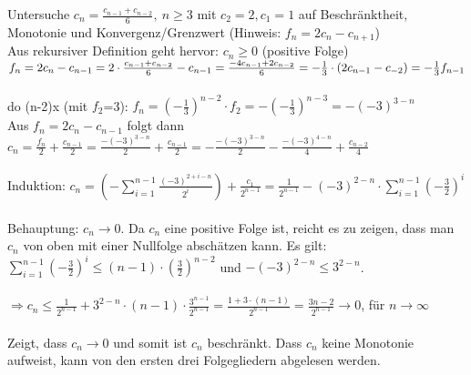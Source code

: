 \begin{example}
	Untersuche $c_n = \frac{c_{n-1} + c_{n-2}}{6},~n \geq 3$ mit $c_2 = 2, c_1 = 1$ auf Beschränktheit, Monotonie
	und Konvergenz/Grenzwert (Hinweis: $f_n = 2 c_n - c_{n+1}$)\\
	
	Aus rekursiver Definition geht hervor: $c_n \geq 0$ (positive Folge)\\
    $f_n = 2 c_n -c_{n-1} = 2 \cdot \frac{c_{n-1} + c_{n-2}}{6} - c_{n-1} = \frac{-4 c_{n-1} +
		2c_{n-2}}{6} =-\frac{1}{3} \cdot (2c_{n-1} - c_{-2})\\
        = -\frac{1}{3} f_{n-1}$\\ \\
	do (n-2)x (mit $f_2$=3):
    $f_n = (-\frac{1}{3})^{n-2} \cdot f_2 = -( - \frac{1}{3})^{n-3} = -(-3)^{3-n}$\\ 
	Aus $f_n = 2c_n - c_{n-1}$ folgt dann\\
    $c_n = \frac{f_n}{2} + \frac{c_{n-1}}{2} = \frac{-(-3)^{3-n}}{2} + \frac{c_{n-1}}{2}
							= - \frac{-(-3)^{3-n}}{2} - \frac{-(-3)^{4-n}}{4} + \frac{c_{n-2}}{4}$\\ \\
	Induktion:
    $c_n = ( - \sum^{n-1}_{i=1} \frac{(-3)^{2+i-n}}{2^i}) + \frac{c_1}{2^{n-1}} =
		\frac{1}{2^{n-1}} - (-3)^{2-n} \cdot \sum^{n-1}_{i=1}(-\frac{3}{2})^i$\\ \\
	Behauptung: $c_n \to 0$. Da $c_n$ eine positive Folge ist, reicht es zu zeigen, dass man $c_n$ von oben mit
	einer Nullfolge abschätzen kann. Es gilt: $\sum^{n-1}_{i=1} ( - \frac{3}{2})^i \leq (n-1) \cdot
	( \frac{3}{2})^{n-2}$ und $-(-3)^{2-n} \leq 3^{2-n}$. \\ \\
    $\Rightarrow c_n \leq \frac{1}{2^{n-1}} + 3^{2-n} \cdot (n-1) \cdot \frac{3^{n-1}}{2^{n-1}}
		    = \frac{1 + 3 \cdot (n-1)}{2^{n-1}}
		    = \frac{3n -2}{2^{n-1}}  \to 0$, für $ n \to \infty$\\ \\
	Zeigt, dass $c_n \to 0$ und somit ist $c_n$ beschränkt. Dass $c_n$ keine Monotonie aufweist, kann von den ersten
	drei Folgegliedern abgelesen werden.
\end{example}